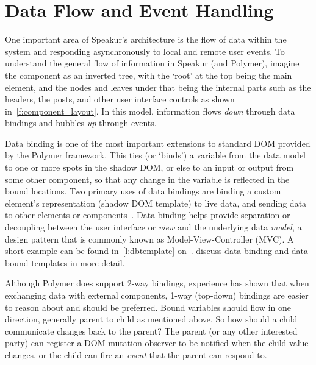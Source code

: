 
\section{Data Flow and Event Handling}
One important area of Speakur's architecture is the flow of data within the system and responding asynchronously to local and remote user events.
To understand the general flow of information in Speakur (and Polymer), imagine the component as an inverted tree, with the `root' at the top being the main  element, 
and the nodes and leaves under that being the internal parts such as the headers, the posts, and other user interface controls as shown in~\cref{f:component_layout}.
In this model, information flows \textit{down} through data bindings and bubbles \textit{up} through events.

Data binding is one of the most important extensions to standard DOM provided by the Polymer framework. 
This ties (or `binds') a variable from the data model to one or more spots in the shadow DOM, or else to an input or output from some other component, 
so that any change in the variable is reflected in the bound locations.
Two primary uses of data bindings are
binding a custom element's representation (shadow DOM template) to live data, 
and sending data to other elements or components~\cite{polymercontributors2015-b}. 
Data binding helps provide separation or decoupling between the user interface or \textit{view} and the underlying data \textit{model}, 
a design pattern that is commonly known as 
Model-View-Controller (MVC).
A short example can be found in~\cref{l:dbtemplate} on~.
 discuss data binding and data-bound templates in more detail.

Although Polymer does support 2-way bindings, 
experience has shown that when exchanging data with external components, 1-way (top-down) bindings are easier to reason about and should be preferred.
Bound variables should flow in one direction, generally parent to child as mentioned above.
So how should a child communicate changes back to the parent? 
The parent (or any other interested party) can register a DOM mutation observer to be notified when the child value changes, or the child can fire an \textit{event} that the parent can respond to.

